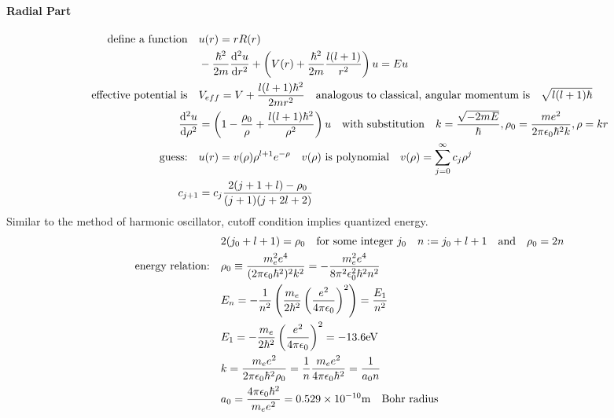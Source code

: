 \documentclass[a4paper,10pt]{article}
\begin{document}
\paragraph{Radial Part}
\begin{align*}
    \qq{define a function}      & u(r)=rR(r)                                                                                                                                                            \\
                                & -\frac{\hbar^2}{2m}\dv[2]{u}{r}+\left(V(r)+\frac{\hbar^2}{2m}\frac{l(l+1)}{r^2}\right)u=Eu                                                                            \\
    \qq{effective potential is} & V_{eff}=V+\frac{l(l+1)\hbar^2}{2mr^2}\qq{analogous to classical, angular momentum is}\sqrt{l(l+1)\hbar}                                                               \\
    \dv[2]{u}{\rho}             & =\left(1-\frac{\rho_0}{\rho}+\frac{l(l+1)\hbar^2}{\rho^2}\right)u\qq{with substitution}k=\frac{\sqrt{-2mE}}{\hbar},\rho_0=\frac{me^2}{2\pi\epsilon_0\hbar^2k},\rho=kr \\
    \qq{guess:}                 & u(r)=v(\rho)\rho^{l+1}e^{-\rho}\qq{$v(\rho)$ is polynomial}v(\rho)=\sum_{j=0}^{\infty}c_j\rho^j                                                                       \\
    c_{j+1}                     & =c_j\frac{2(j+1+l)-\rho_0}{(j+1)(j+2l+2)}
\end{align*}
Similar to the method of harmonic oscillator, cutoff condition implies quantized energy.
\begin{align*}
                          & 2(j_0+l+1)=\rho_0\qq{for some integer $j_0$}n:=j_0+l+1\qq{and}\rho_0=2n                                      \\
    \qq{energy relation:} & \rho_0\equiv\frac{m_e^2e^4}{(2\pi\epsilon_0\hbar^2)^2k^2}=-\frac{m_e^2e^4}{8\pi^2\epsilon_0^2\hbar^2n^2}     \\
                          & E_n=-\frac{1}{n^2}\left(\frac{m_e}{2\hbar^2}\left(\frac{e^2}{4\pi\epsilon_0}\right)^2\right)=\frac{E_1}{n^2} \\
                          & E_1=-\frac{m_e}{2\hbar^2}\left(\frac{e^2}{4\pi\epsilon_0}\right)^2=-13.6\unit{eV}                            \\
                          & k=\frac{m_ee^2}{2\pi\epsilon_0\hbar^2\rho_0}=\frac{1}{n}\frac{m_ee^2}{4\pi\epsilon_0\hbar^2}=\frac{1}{a_0n}  \\
                          & a_0=\frac{4\pi\epsilon_0\hbar^2}{m_ee^2}=\num{0.529e{-10}}\unit{m}\qq{Bohr radius}
\end{align*}
\end{document}
